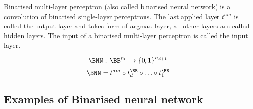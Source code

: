 \begin{definition}
Binarised multi-layer perceptron (also called binarised neural network)
is a convolution of binarised single-layer perceptrons.
The last applied layer $t^{am}$ is called the output layer and takes form of argmax layer,
all other layers are called hidden
layers. The input of a binarised multi-layer perceptron is called the input layer.

\begin{equation*}
    \BNN: \, \BB^{n_0} \to {\{0, 1\}}^{n_{d+1}}
\end{equation*}
\begin{equation*}
    \BNN = t^{am} \circ t_d^\BB \circ \ldots \circ t_1^\BB
\end{equation*}
\end{definition}

\subsection{Examples of Binarised neural network}


\sectionsep{}

